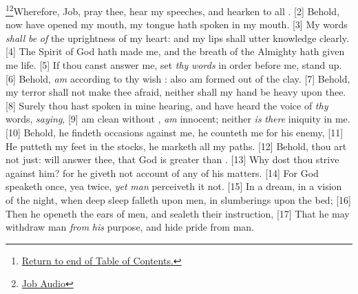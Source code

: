 \footnote{\textcolor[cmyk]{0.99998,1,0,0}{\hyperlink{TOC}{Return to end of Table of Contents.}}}\footnote{\href{https://www.audioverse.org/english/audiobibles/books/ENGKJV/O/Job/1}{\textcolor[cmyk]{0.99998,1,0,0}{Job  Audio}}}\textcolor[cmyk]{0.99998,1,0,0}{Wherefore, Job,   pray thee, hear my speeches, and hearken to all  .} %
[2] \textcolor[cmyk]{0.99998,1,0,0}{Behold, now   have opened my mouth, my tongue hath spoken in my mouth.}
[3] \textcolor[cmyk]{0.99998,1,0,0}{My words \emph{shall} \emph{be} \emph{of} the uprightness of my heart: and my lips shall utter knowledge clearly.}
[4] \textcolor[cmyk]{0.99998,1,0,0}{The Spirit of God hath made me, and the breath of the Almighty hath given me life.}
[5] \textcolor[cmyk]{0.99998,1,0,0}{If thou canst answer me, set \emph{thy} \emph{words} in order before me, stand up.}
[6] \textcolor[cmyk]{0.99998,1,0,0}{Behold,   \emph{am} according to thy wish :   also am formed out of the clay.}
[7] \textcolor[cmyk]{0.99998,1,0,0}{Behold, my terror shall not make thee afraid, neither shall my hand be heavy upon thee.}
[8] \textcolor[cmyk]{0.99998,1,0,0}{Surely thou hast spoken in mine hearing, and   have heard the voice of \emph{thy} words, \emph{saying},}
[9] \textcolor[cmyk]{0.99998,1,0,0}{  am clean without ,   \emph{am} innocent; neither \emph{is} \emph{there} iniquity in me.}
[10] \textcolor[cmyk]{0.99998,1,0,0}{Behold, he findeth occasions against me, he counteth me for his enemy,}
[11] \textcolor[cmyk]{0.99998,1,0,0}{He putteth my feet in the stocks, he marketh all my paths.}
[12] \textcolor[cmyk]{0.99998,1,0,0}{Behold,  thou art not just:   will answer thee, that God is greater than .}
[13] \textcolor[cmyk]{0.99998,1,0,0}{Why dost thou strive against him? for he giveth not account of any of his matters.}
[14] \textcolor[cmyk]{0.99998,1,0,0}{For God speaketh once, yea twice, \emph{yet} \emph{man} perceiveth it not.}
[15] \textcolor[cmyk]{0.99998,1,0,0}{In a dream, in a vision of the night, when deep sleep falleth upon men, in slumberings upon the bed;}
[16] \textcolor[cmyk]{0.99998,1,0,0}{Then he openeth the ears of men, and sealeth their instruction,}
[17] \textcolor[cmyk]{0.99998,1,0,0}{That he may withdraw man \emph{from} \emph{his} purpose, and hide pride from man.}
